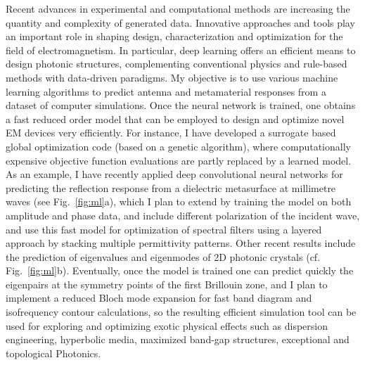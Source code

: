 \documentclass[11pt]{academia}
\begin{document}

Recent advances in experimental and computational methods are increasing the quantity
and complexity of generated data. Innovative approaches and tools play
an important role in shaping design, characterization and optimization for the field of
electromagnetism. In particular, deep learning offers an efficient means to design photonic
structures\autocite{maDeepLearningDesign2020}, complementing conventional physics 
and rule-based methods with data-driven paradigms. My objective is to use various machine 
learning algorithms to predict antenna and metamaterial responses from 
a dataset of computer simulations. Once the neural network is trained, one obtains 
a fast reduced order model that can be employed to design and optimize novel EM devices 
very efficiently. For instance, I have developed a surrogate based global optimization 
code (based on a genetic algorithm), where computationally 
expensive objective function evaluations are partly replaced by a learned model. 
As an example, I have recently applied deep convolutional 
neural networks for predicting the reflection response from a dielectric metasurface 
at millimetre waves (see Fig.~\ref{fig:ml}a), which I plan to extend by 
training the model on both amplitude and phase data, and include different polarization 
of the incident wave, and use this fast model for optimization of spectral filters using 
a layered approach by stacking multiple permittivity patterns. 
Other recent results include the prediction of eigenvalues and eigenmodes of 2D 
photonic crystals (cf. Fig.~\ref{fig:ml}b). Eventually, once the model is trained
 one can predict quickly the eigenpairs at the symmetry points of the first Brillouin zone, 
 and I plan to implement a reduced Bloch mode expansion\autocite{husseinReducedBlochMode2009} for fast band diagram and 
 isofrequency contour calculations, so the resulting efficient simulation tool 
 can be used for exploring and optimizing exotic physical effects such as dispersion engineering, hyperbolic media, maximized band-gap structures, exceptional and topological Photonics.
  
\end{document}

